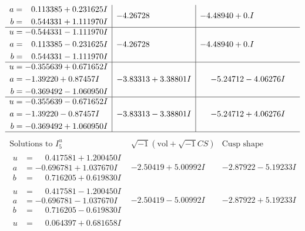 \documentclass[1p]{elsarticle_modified}
\theoremstyle{definition}
\newcommand{\I}{\sqrt{-1}}
\begin{document}
$$\begin{array}{c|c|c}
\begin{aligned}
a &= \phantom{-}0.113385 + 0.231625 I \\
b &= \phantom{-}0.544331 + 1.111970 I\end{aligned}
 & -4.26728\phantom{ +0.000000I} & -4.48940 + 0. I\phantom{ +0.000000I} \\ \hline\begin{aligned}
u &= -0.544331 - 1.111970 I \\
a &= \phantom{-}0.113385 - 0.231625 I \\
b &= \phantom{-}0.544331 - 1.111970 I\end{aligned}
 & -4.26728\phantom{ +0.000000I} & -4.48940 + 0. I\phantom{ +0.000000I} \\ \hline\begin{aligned}
u &= -0.355639 + 0.671652 I \\
a &= -1.39220 + 0.87457 I \\
b &= -0.369492 - 1.060950 I\end{aligned}
 & -3.83313 + 3.38801 I & -5.24712 - 4.06276 I \\ \hline\begin{aligned}
u &= -0.355639 - 0.671652 I \\
a &= -1.39220 - 0.87457 I \\
b &= -0.369492 + 1.060950 I\end{aligned}
 & -3.83313 - 3.38801 I & -5.24712 + 4.06276 I\\
 \hline 
 \end{array}$$\newpage$$\begin{array}{c|c|c}  
\text{Solutions to }I^u_{5}& \I (\text{vol} + \sqrt{-1}CS) & \text{Cusp shape}\\
 \hline 
\begin{aligned}
u &= \phantom{-}0.417581 + 1.200450 I \\
a &= -0.696781 + 1.037670 I \\
b &= \phantom{-}0.716205 + 0.619830 I\end{aligned}
 & -2.50419 + 5.00992 I & -2.87922 - 5.19233 I \\ \hline\begin{aligned}
u &= \phantom{-}0.417581 - 1.200450 I \\
a &= -0.696781 - 1.037670 I \\
b &= \phantom{-}0.716205 - 0.619830 I\end{aligned}
 & -2.50419 - 5.00992 I & -2.87922 + 5.19233 I \\ \hline\begin{aligned}
u &= \phantom{-}0.064397 + 0.681658 I \\

\end{aligned}
\end{array}$$
\end{document}
